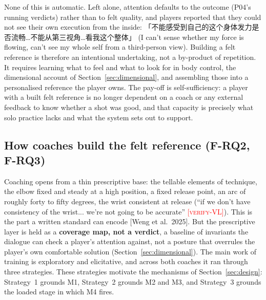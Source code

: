 \documentclass[sigconf]{acmart}
\newcommand{\vf}[1]{\textcolor{red}{[\textsc{#1}]}}
\begin{document}
None of this is automatic. Left alone, attention defaults to the outcome (P04's running verdicts) rather than to felt quality, and players reported that they could not see their own execution from the inside: 「不能感受到自己的这个身体发力是否流畅…不能从第三视角…看我这个整体」 (I can't sense whether my force is flowing, can't see my whole self from a third-person view). Building a felt reference is therefore an intentional undertaking, not a by-product of repetition. It requires learning what to feel and what to look for in body control, the dimensional account of Section~\ref{sec:dimensional}, and assembling those into a personalised reference the player owns. The pay-off is self-sufficiency: a player with a built felt reference is no longer dependent on a coach or any external feedback to know whether a shot was good, and that capacity is precisely what solo practice lacks and what the system sets out to support.

\subsection{How coaches build the felt reference (F-RQ2, F-RQ3)}

Coaching opens from a thin prescriptive base: the tellable elements of technique, the elbow fixed and steady at a high position, a fixed release point, an arc of roughly forty to fifty degrees, the wrist consistent at release (``if we don't have consistency of the wrist... we're not going to be accurate'' \vf{verify-VL}). This is the part a written standard can encode [Weng et al.\ 2025]. But the prescriptive layer is held as a \textbf{coverage map, not a verdict}, a baseline of invariants the dialogue can check a player's attention against, not a posture that overrules the player's own comfortable solution (Section~\ref{sec:dimensional}). The main work of training is exploratory and elicitative, and across both coaches it ran through three strategies. These strategies motivate the mechanisms of Section~\ref{sec:design}: Strategy~1 grounds M1, Strategy~2 grounds M2 and M3, and Strategy~3 grounds the loaded stage in which M4 fires.
\end{document}
